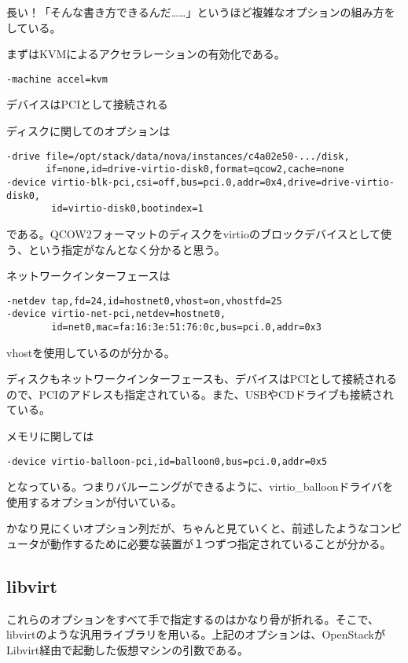 \documentclass[9pt,b5paper,tombo]{jsbook}
\begin{document}
長い！「そんな書き方できるんだ……」というほど複雑なオプションの組み方をしている。

まずはKVMによるアクセラレーションの有効化である。

\begin{lstlisting}
-machine accel=kvm
\end{lstlisting}

デバイスはPCIとして接続される


ディスクに関してのオプションは

\begin{lstlisting}
-drive file=/opt/stack/data/nova/instances/c4a02e50-.../disk,
       if=none,id=drive-virtio-disk0,format=qcow2,cache=none
-device virtio-blk-pci,csi=off,bus=pci.0,addr=0x4,drive=drive-virtio-disk0,
        id=virtio-disk0,bootindex=1
\end{lstlisting}

である。QCOW2フォーマットのディスクをvirtioのブロックデバイスとして使う、という指定がなんとなく分かると思う。

ネットワークインターフェースは

\begin{lstlisting}
-netdev tap,fd=24,id=hostnet0,vhost=on,vhostfd=25
-device virtio-net-pci,netdev=hostnet0,
        id=net0,mac=fa:16:3e:51:76:0c,bus=pci.0,addr=0x3
\end{lstlisting}

vhostを使用しているのが分かる。

ディスクもネットワークインターフェースも、デバイスはPCIとして接続されるので、PCIのアドレスも指定されている。また、USBやCDドライブも接続されている。

メモリに関しては

\begin{lstlisting}
-device virtio-balloon-pci,id=balloon0,bus=pci.0,addr=0x5
\end{lstlisting}

となっている。つまりバルーニングができるように、virtio\_balloonドライバを使用するオプションが付いている。

かなり見にくいオプション列だが、ちゃんと見ていくと、前述したようなコンピュータが動作するために必要な装置が１つずつ指定されていることが分かる。

\subsection{libvirt}

これらのオプションをすべて手で指定するのはかなり骨が折れる。そこで、libvirtのような汎用ライブラリを用いる。上記のオプションは、OpenStackがLibvirt経由で起動した仮想マシンの引数である。
\end{document}
